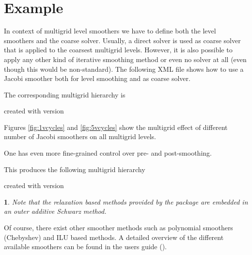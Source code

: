 \documentclass[10pt,fleqn]{book}
\newtheorem*{mycomment}{\ding{42}}
\newcommand\printScreenOutput[1]{

{\vspace{-0.3cm}\hfill\tiny{created with \muelu version }}
}
\begin{document}
\section{Example}
In context of multigrid level smoothers we have to define both the level smoothers and the coarse solver. Usually, a direct solver is used as coarse solver that is applied to the coarsest multigrid levels. However, it is also possible to apply any other kind of iterative smoothing method or even no solver at all (even though this would be non-standard). The following XML file shows how to use a Jacobi smoother both for level smoothing and as coarse solver.

The corresponding multigrid hierarchy is
\printScreenOutput{s1_easy_jacobi.txt_3.fragment_3.fragment}

Figures \ref{fig:1vcycles} and \ref{fig:5vcycles} show the multigrid effect of different number of Jacobi smoothers on all multigrid levels.

One has even more fine-grained control over pre- and post-smoothing.

This produces the following multigrid hierarchy
\printScreenOutput{s1_easy_jacobi2.txt_3.fragment_3.fragment}

\begin{mycomment}
Note that the relaxation based methods provided by the \ifpack package are embedded in an outer additive Schwarz method.
\end{mycomment}

Of course, there exist other smoother methods such as polynomial smoothers (Chebyshev) and ILU based methods.
A detailed overview of the different available smoothers can be found in the \muelu users guide (\cite{Mue}).
\end{document}
